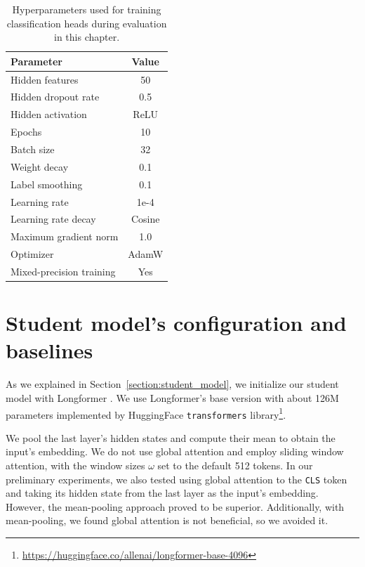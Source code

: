 \begin{table}
  \centering
  \footnotesize

  \begin{tabular}{l c}
    \toprule
    Parameter & Value \\
    \midrule
    Hidden features & 50 \\
    Hidden dropout rate & 0.5 \\
    Hidden activation & ReLU \\
    Epochs & 10 \\
    Batch size & 32 \\
    Weight decay & 0.1 \\
    Label smoothing & 0.1 \\
    Learning rate & 1e-4 \\
    Learning rate decay & Cosine \\
    Maximum gradient norm & 1.0 \\
    Optimizer & AdamW \\
    Mixed-precision training & Yes \\
    \bottomrule
  \end{tabular}

  \caption{Hyperparameters used for training classification heads during
  evaluation in this chapter.}

  \label{table:head_train_params}

\end{table}

\section{Student model's configuration and baselines}\label{section:student_model_config_baselines}

As we explained in Section~\ref{section:student_model}, we initialize our
student model with Longformer \citep{beltagy2020longformer}. We use
Longformer's base version with about 126M parameters implemented by HuggingFace
\texttt{transformers}
library\footnote{\url{https://huggingface.co/allenai/longformer-base-4096}}.

We pool the last layer's hidden states and compute their mean to obtain the
input's embedding. We do not use global attention and employ sliding window
attention, with the window sizes $\omega$ set to the default 512 tokens. In our
preliminary experiments, we also tested using global attention to the
\texttt{CLS} token and taking its hidden state from the last layer as the
input's embedding. However, the mean-pooling approach proved to be superior.
Additionally, with mean-pooling, we found global attention is not beneficial,
so we avoided it.


